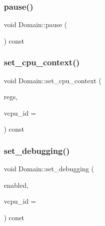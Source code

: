 \mbox{\label{classxd_1_1xen_1_1_domain_ac06b17738ec10f533941f26f13082f42}} 
\subsubsection{\texorpdfstring{pause()}{pause()}}
{\footnotesize\ttfamily void Domain\+::pause (\begin{DoxyParamCaption}{ }\end{DoxyParamCaption}) const}

\mbox{\label{classxd_1_1xen_1_1_domain_a001722741a173b6a6c1ed8c89b8ee131}} 
\subsubsection{\texorpdfstring{set\+\_\+cpu\+\_\+context()}{set\_cpu\_context()}}
{\footnotesize\ttfamily void Domain\+::set\+\_\+cpu\+\_\+context (\begin{DoxyParamCaption}\item[{\mbox{\hyperlink{namespacexd_1_1reg_a0c10a4d10e689bc16f6f1a8feb4fb9b8}{xd\+::reg\+::\+Registers\+X86}}}]{regs,  }\item[{\mbox{\hyperlink{namespacexd_1_1xen_ac71045dda8a7d9d6fd0d7643001bb14e}{V\+C\+P\+U\+\_\+\+ID}}}]{vcpu\+\_\+id = {} }\end{DoxyParamCaption}) const}

\mbox{\label{classxd_1_1xen_1_1_domain_aa4f3feaa204170aa110e9e339c68817d}} 
\subsubsection{\texorpdfstring{set\+\_\+debugging()}{set\_debugging()}}
{\footnotesize\ttfamily void Domain\+::set\+\_\+debugging (\begin{DoxyParamCaption}\item[{bool}]{enabled,  }\item[{\mbox{\hyperlink{namespacexd_1_1xen_ac71045dda8a7d9d6fd0d7643001bb14e}{V\+C\+P\+U\+\_\+\+ID}}}]{vcpu\+\_\+id = {} }\end{DoxyParamCaption}) const}

